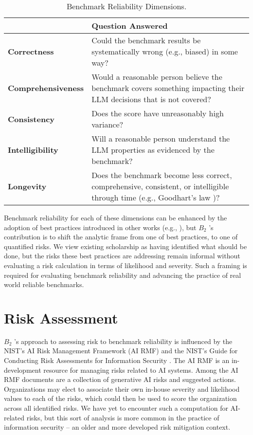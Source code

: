 \documentclass{article}
\newcommand\bb{$B_2$ }
\begin{document}
\begin{table}[h!]
  \caption{Benchmark Reliability Dimensions.}
  \label{tab:benchmark-reliability-dimensions}
\label{tab:dimensions}
  \centering
  \begin{tabular}{lp{10cm}}
    \toprule
    & \textbf{Question Answered} \\
    \midrule
    \textbf{Correctness} & Could the benchmark results be systematically wrong (e.g., biased) in some way? \\
    \textbf{Comprehensiveness} & Would a reasonable person believe the benchmark covers something impacting their LLM decisions that is not covered? \\
    \textbf{Consistency} & Does the score have unreasonably high variance? \\
    \textbf{Intelligibility} & Will a reasonable person understand the LLM properties as evidenced by the benchmark? \\
    \textbf{Longevity} & Does the benchmark become less correct, comprehensive, consistent, or intelligible through time (e.g., Goodhart's law \cite{strathern_improving_1997,manheim_categorizing_2019})? \\
    \bottomrule
  \end{tabular}
\end{table}

Benchmark reliability for each of these dimensions can be enhanced by the adoption of best practices introduced in other works (e.g., \cite{reuel2024betterbench,cao2025should}), but \bb's contribution is to shift the analytic frame from one of best practices, to one of quantified risks. We view existing scholarship as having identified what should be done, but the risks these best practices are addressing remain informal without evaluating a risk calculation in terms of likelihood and severity. Such a framing is required for evaluating benchmark reliability and advancing the practice of real world reliable benchmarks.

\section{Risk Assessment}
\bb's approach to assessing risk to benchmark reliability is influenced by the NIST's AI Risk Management Framework (AI RMF) \cite{nistAI_RMF} and the NIST's Guide for Conducting Risk Assessments for Information Security \cite{nist80030r1}. The AI RMF is an in-development resource for managing risks related to AI systems. Among the AI RMF documents are a collection of generative AI risks and suggested actions. Organizations may elect to associate their own in-house severity and likelihood values to each of the risks, which could then be used to score the organization across all identified risks. We have yet to encounter such a computation for AI-related risks, but this sort of analysis is more common in the practice of information security -- an older and more developed risk mitigation context.
\end{document}
